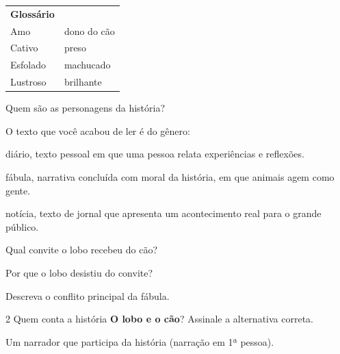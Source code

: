 \begin{conteudo}
\begin{conteudo}
\begin{conteudo}
\begin{conteudo}
\begin{tabular}{ll}
\textbf{Glossário} & \mbox{}\\
Amo & dono do cão\\
Cativo & preso\\
Esfolado & machucado\\
Lustroso & brilhante\\
\end{tabular}

\begin{escolha}
\item Quem são as personagens da história?
\item{}

\item O texto que você acabou de ler é do gênero:

\begin{boxlist}
 diário, texto pessoal em que uma pessoa relata experiências e reflexões.

 fábula, narrativa concluída com moral da história, em que animais agem como gente.

 notícia, texto de jornal que apresenta um acontecimento real para o grande público.
\end{boxlist}

\item Qual convite o lobo recebeu do cão?
\item{}

\item Por que o lobo desistiu do convite?
\item{}

\item Descreva o conflito principal da fábula.
\item{}
\end{escolha}

\num{2} Quem conta a história \textbf{O lobo e o cão}? Assinale a alternativa correta.

\begin{boxlist}
 Um narrador que participa da história (narração em 1ª pessoa).


\end{boxlist}
\end{conteudo}
\end{conteudo}
\end{conteudo}
\end{conteudo}
